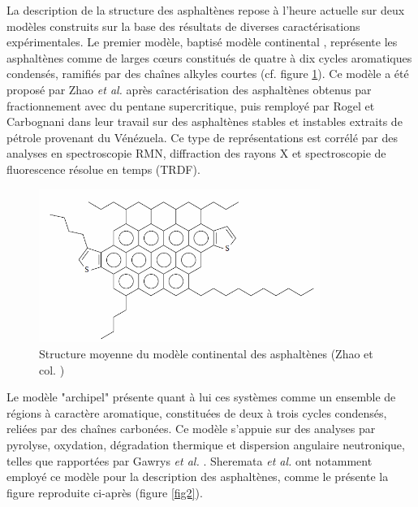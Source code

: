 La description de la structure des asphaltènes repose à l'heure actuelle sur deux modèles construits sur la base des résultats de diverses caractérisations expérimentales.  
Le premier modèle, baptisé modèle \og continental \fg, représente les asphaltènes comme de larges cœurs constitués de quatre à dix cycles aromatiques condensés, ramifiés par des chaînes alkyles courtes \cite{groenzin2000molecular} (cf. figure \ref{figZ1}). Ce modèle a été proposé par Zhao \textit{et al.} \cite{zhao2001molecular} après caractérisation des asphaltènes obtenus par fractionnement avec du pentane supercritique, puis remployé par Rogel et Carbognani \cite{rogel2003density} dans leur travail sur des asphaltènes stables et instables extraits de pétrole provenant du Vénézuela. 
Ce type de représentations est corrélé par des analyses en spectroscopie RMN, diffraction des rayons X et spectroscopie de fluorescence résolue en temps (TRDF). 



\begin{figure}[h!]
	\centering
	\includegraphics[height=5cm]{image/Zhao}
	\caption[Structure moyenne du modèle continental des asphaltènes]{Structure moyenne du modèle continental des asphaltènes (Zhao et col. \cite{zhao2001molecular})}
	\label{figZ1}
\end{figure}


Le modèle "archipel" présente quant à lui ces systèmes comme un ensemble de régions à caractère aromatique, constituées de deux à trois cycles condensés, reliées par des chaînes carbonées. Ce modèle s'appuie sur des analyses par pyrolyse, oxydation, dégradation thermique et dispersion angulaire neutronique, telles que rapportées par Gawrys \textit{et al.} \cite{gawrys2003role}. Sheremata \textit{et al.}\cite{sheremata2004quantitative} ont notamment employé ce modèle pour la description des asphaltènes, comme le présente la figure reproduite ci-après (figure \ref{fig2}). 

